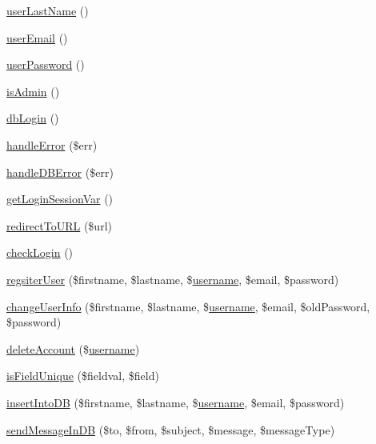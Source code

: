 \begin{DoxyCompactItemize}
\item 
\hyperlink{classdb_validator_aa20388700cde12a2aa68c0b5415c8d3a}{user\-Last\-Name} ()
\item 
\hyperlink{classdb_validator_aad2ba58e8767f5d8d04c1b99f5bd0958}{user\-Email} ()
\item 
\hyperlink{classdb_validator_a560344e934ed8cd8b3af688d64ab4d25}{user\-Password} ()
\item 
\hyperlink{classdb_validator_aabf23b66cd362adaa508de5bfb22706a}{is\-Admin} ()
\item 
\hyperlink{classdb_validator_ab4a1fda4df5c5cb8c50b4c9fe679960b}{db\-Login} ()
\item 
\hyperlink{classdb_validator_a2e0004af8cba0204fd735d882612d989}{handle\-Error} (\$err)
\item 
\hyperlink{classdb_validator_a0f2c8109fd9dec1031a711fb42e94502}{handle\-D\-B\-Error} (\$err)
\item 
\hyperlink{classdb_validator_af2f1a88c934b9701eb257f35fd257a05}{get\-Login\-Session\-Var} ()
\item 
\hyperlink{classdb_validator_a3e9d59f460abd5b96b6b693103cd8839}{redirect\-To\-U\-R\-L} (\$url)
\item 
\hyperlink{classdb_validator_ab8e90adf3e4b15eea283c4ea450a4288}{check\-Login} ()
\item 
\hyperlink{classdb_validator_afe99ea73ddef3bd2227b63d601f7dcd1}{regsiter\-User} (\$firstname, \$lastname, \$\hyperlink{classdb_validator_a7475524fbb2e38dd6c9f7a6661b0bb81}{username}, \$email, \$password)
\item 
\hyperlink{classdb_validator_ab14beda16b51e608c9317706ddf9cb9f}{change\-User\-Info} (\$firstname, \$lastname, \$\hyperlink{classdb_validator_a7475524fbb2e38dd6c9f7a6661b0bb81}{username}, \$email, \$old\-Password, \$password)
\item 
\hyperlink{classdb_validator_a7eda21a465edc729c0f3801016e9c64c}{delete\-Account} (\$\hyperlink{classdb_validator_a7475524fbb2e38dd6c9f7a6661b0bb81}{username})
\item 
\hyperlink{classdb_validator_ad001bae039e1436f8411bbcccc783a48}{is\-Field\-Unique} (\$fieldval, \$field)
\item 
\hyperlink{classdb_validator_afb82cd177f4750eaa831cdb41fddd4a1}{insert\-Into\-D\-B} (\$firstname, \$lastname, \$\hyperlink{classdb_validator_a7475524fbb2e38dd6c9f7a6661b0bb81}{username}, \$email, \$password)
\item 
\hyperlink{classdb_validator_a203aedcf96613e8ad2cb6273bf664263}{send\-Message\-In\-D\-B} (\$to, \$from, \$subject, \$message, \$message\-Type)

\end{DoxyCompactItemize}
